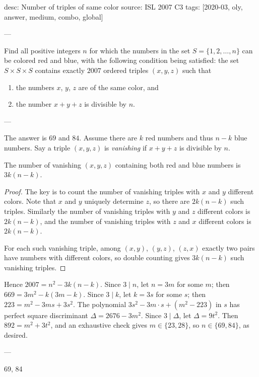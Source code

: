 desc: Number of triples of same color
source: ISL 2007 C3
tags: [2020-03, oly, answer, medium, combo, global]

---

Find all positive integers $n$ for which the numbers in the set $S=\{1,2,\ldots,n\}$ can be colored red and blue, with the following condition being satisfied: the set $S\times S\times S$ contains exactly $2007$ ordered triples $(x,y,z)$ such that
\begin{enumerate}[label=(\roman*),itemsep=0em]
    \item the numbers $x$, $y$, $z$ are of the same color, and
    \item the number $x+y+z$ is divisible by $n$.
\end{enumerate}

---

The answer is $69$ and $84$. Assume there are $k$ red numbers and thus $n-k$ blue numbers. Say a triple $(x,y,z)$ is \emph{vanishing} if $x+y+z$ is divisible by $n$.
\begin{claim*}
    The number of vanishing $(x,y,z)$ containing both red and blue numbers is $3k(n-k)$.
\end{claim*}
\begin{proof}
    The key is to count the number of vanishing triples with $x$ and $y$ different colors. Note that $x$ and $y$ uniquely determine $z$, so there are $2k(n-k)$ such triples. Similarly the number of vanishing triples with $y$ and $z$ different colors is $2k(n-k)$, and the number of vanishing triples with $z$ and $x$ different colors is $2k(n-k)$.

    For each such vanishing triple, among $(x,y)$, $(y,z)$, $(z,x)$ exactly two pairs have numbers with different colors, so double counting gives $3k(n-k)$ such vanishing triples.
\end{proof}

Hence $2007=n^2-3k(n-k)$. Since $3\mid n$, let $n=3m$ for some $m$; then $669=3m^2-k(3m-k)$. Since $3\mid k$, let $k=3s$ for some $s$; then $223=m^2-3ms+3s^2$. The polynomial $3s^2-3m\cdot s+(m^2-223)$ in $s$ has perfect square discriminant $\Delta=2676-3m^2$. Since $3\mid\Delta$, let $\Delta=9t^2$. Then $892=m^2+3t^2$, and an exhaustive check gives $m\in\{23,28\}$, so $n\in\{69,84\}$, as desired.

---

69, 84
